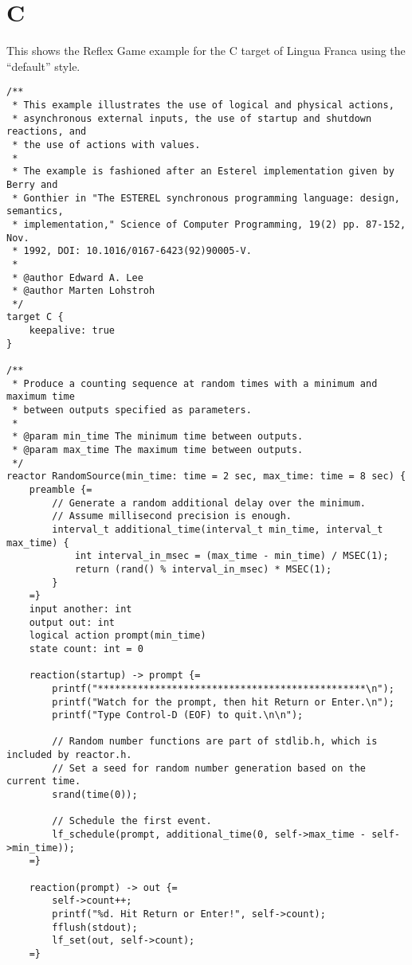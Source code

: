 \documentclass{article}
\begin{document}
\section{C}

This shows the Reflex Game example for the C target of Lingua Franca using the
``default'' style.

\begin{verbatim}
/**
 * This example illustrates the use of logical and physical actions,
 * asynchronous external inputs, the use of startup and shutdown reactions, and
 * the use of actions with values.
 *
 * The example is fashioned after an Esterel implementation given by Berry and
 * Gonthier in "The ESTEREL synchronous programming language: design, semantics,
 * implementation," Science of Computer Programming, 19(2) pp. 87-152, Nov.
 * 1992, DOI: 10.1016/0167-6423(92)90005-V.
 *
 * @author Edward A. Lee
 * @author Marten Lohstroh
 */
target C {
    keepalive: true
}

/**
 * Produce a counting sequence at random times with a minimum and maximum time
 * between outputs specified as parameters.
 *
 * @param min_time The minimum time between outputs.
 * @param max_time The maximum time between outputs.
 */
reactor RandomSource(min_time: time = 2 sec, max_time: time = 8 sec) {
    preamble {=
        // Generate a random additional delay over the minimum.
        // Assume millisecond precision is enough.
        interval_t additional_time(interval_t min_time, interval_t max_time) {
            int interval_in_msec = (max_time - min_time) / MSEC(1);
            return (rand() % interval_in_msec) * MSEC(1);
        }
    =}
    input another: int
    output out: int
    logical action prompt(min_time)
    state count: int = 0

    reaction(startup) -> prompt {=
        printf("***********************************************\n");
        printf("Watch for the prompt, then hit Return or Enter.\n");
        printf("Type Control-D (EOF) to quit.\n\n");

        // Random number functions are part of stdlib.h, which is included by reactor.h.
        // Set a seed for random number generation based on the current time.
        srand(time(0));

        // Schedule the first event.
        lf_schedule(prompt, additional_time(0, self->max_time - self->min_time));
    =}

    reaction(prompt) -> out {=
        self->count++;
        printf("%d. Hit Return or Enter!", self->count);
        fflush(stdout);
        lf_set(out, self->count);
    =}


\end{verbatim}
\end{document}

